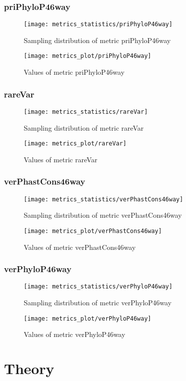 \section{priPhyloP46way}
\begin{figure}
  \texttt{[image: metrics\_statistics/priPhyloP46way]}
  \caption{Sampling distribution of metric priPhyloP46way}
\end{figure}
\begin{figure}
  \texttt{[image: metrics\_plot/priPhyloP46way]}
  \caption{Values of metric priPhyloP46way}
\end{figure}
\section{rareVar}
\begin{figure}
  \texttt{[image: metrics\_statistics/rareVar]}
  \caption{Sampling distribution of metric rareVar}
\end{figure}
\begin{figure}
  \texttt{[image: metrics\_plot/rareVar]}
  \caption{Values of metric rareVar}
\end{figure}
\section{verPhastCons46way}
\begin{figure}
  \texttt{[image: metrics\_statistics/verPhastCons46way]}
  \caption{Sampling distribution of metric verPhastCons46way}
\end{figure}
\begin{figure}
  \texttt{[image: metrics\_plot/verPhastCons46way]}
  \caption{Values of metric verPhastCons46way}
\end{figure}
\section{verPhyloP46way}
\begin{figure}
  \texttt{[image: metrics\_statistics/verPhyloP46way]}
  \caption{Sampling distribution of metric verPhyloP46way}
\end{figure}
\begin{figure}
  \texttt{[image: metrics\_plot/verPhyloP46way]}
  \caption{Values of metric verPhyloP46way}
\end{figure}

\part{Theory}
